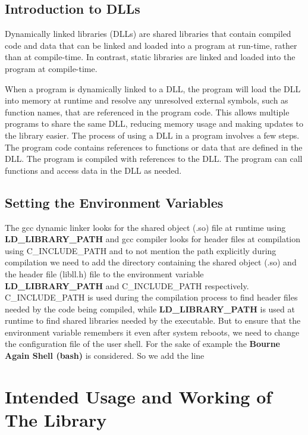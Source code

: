 \documentclass{article}
\begin{document}
  \subsection{Introduction to DLLs}
  {\linespread{1.0}
  Dynamically linked libraries (DLLs) are shared libraries that
  contain compiled code and data that can be linked and loaded into a
  program at run-time, rather than at compile-time. In contrast,
  static libraries are linked and loaded into the program at
  compile-time.

When a program is dynamically linked to a DLL, the program will load
the DLL into memory at runtime and resolve any unresolved external
symbols, such as function names, that are referenced in the program
code. This allows multiple programs to share the same DLL, reducing
memory usage and making updates to the library easier.  The process of
using a DLL in a program involves a few steps.  The program code
contains references to functions or data that are defined in the DLL.
The program is compiled with references to the DLL.  The program can
call functions and access data in the DLL as needed.
\subsection{Setting the Environment Variables}
The gcc dynamic linker looks for the shared object (.so) file at
runtime using \textbf{LD\_LIBRARY\_PATH} and gcc compiler looks for
header files at compilation using C\_INCLUDE\_PATH and to not mention
the path explicitly during compilation we need to add the
directory containing the shared object (.so) and the header file
(libll.h) file to the environment variable \textbf{LD\_LIBRARY\_PATH}
and C\_INCLUDE\_PATH respectively. C\_INCLUDE\_PATH is used during the
compilation process to find header files needed by the code being
compiled, while \textbf{LD\_LIBRARY\_PATH} is used at runtime to find
shared libraries needed by the executable. But to ensure that the
environment variable remembers it even after system reboots, we need
to change the configuration file of the user shell. For the sake of
example the \textbf{Bourne Again Shell (bash)} is considered.  So we
add the line \textbf{}
  \textbf{}
  }
  \section{\textbf{Intended Usage and Working of The Library}}
\end{document}
